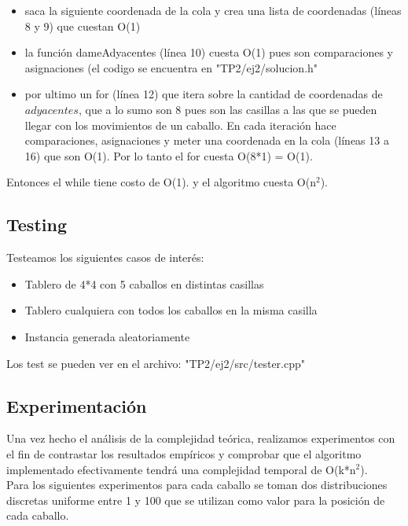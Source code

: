 \begin{itemize}
	\item  saca la siguiente coordenada de la cola y crea una lista de coordenadas (líneas 8 y 9) que cuestan O(1)
	\item  la función dameAdyacentes (línea 10) cuesta O(1) pues son comparaciones y asignaciones (el codigo se encuentra en "TP2/ej2/solucion.h"
	\item  por ultimo un for (línea 12) que itera sobre la cantidad de coordenadas de $adyacentes$, que a lo sumo son 8 pues son las casillas a las que se pueden llegar con los movimientos de un caballo. En cada iteración hace comparaciones, asignaciones y meter una coordenada en la cola (líneas 13 a 16) que son O(1). Por lo tanto el for cuesta O(8*1) = O(1).
\end{itemize}

Entonces el while tiene costo de O(1). y el algoritmo cuesta O(n$^{2}$).








\subsection{Testing}

Testeamos los siguientes casos de interés:
\begin{itemize}
	\item Tablero de 4*4 con 5 caballos en distintas casillas
	\item Tablero cualquiera con todos los caballos en la misma casilla
	\item Instancia generada aleatoriamente
\end{itemize}


Los test se pueden ver en el archivo: "TP2/ej2/src/tester.cpp"



\subsection{Experimentación}
Una vez hecho el análisis de la complejidad teórica, realizamos experimentos con el fin de contrastar los resultados empíricos y comprobar que el algoritmo implementado efectivamente tendrá una complejidad temporal de O(k*n$^{2}$).\\
Para los siguientes experimentos para cada caballo se toman dos distribuciones discretas uniforme entre 1 y 100 que se utilizan como valor para la posición de cada caballo.


